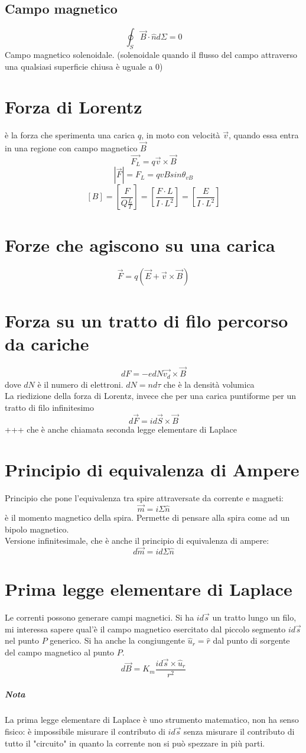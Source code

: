 \documentclass[a4paper]{report}
\begin{document}
  \subsection{Campo magnetico}
  \[ \oint_S \vec{B}\cdot \hat{n} d\Sigma = 0 \]
  Campo magnetico solenoidale. (solenoidale quando il flusso del campo attraverso una qualsiasi superficie chiusa è uguale a 0)

  \section{Forza di Lorentz}
  è la forza che sperimenta una carica $q$, in moto con velocità $\vec{v}$, quando essa entra in una regione con campo magnetico $\vec{B}$
  \[ \vec{F_L} = q\vec{v} \times \vec{B} \]
  \[ |\vec{F}| = F_L = qvB sin\theta_{vB} \]
  \[ [B] = [\frac{F}{Q\frac{L}{T}}] = [\frac{F\cdot L}{I\cdot L^2}] = [\frac{E}{I\cdot L^2}] \]

  \section{Forze che agiscono su una carica}
  \[ \vec{F} = q(\vec{E} + \vec{v} \times \vec{B}) \]

  \section{Forza su un tratto di filo percorso da cariche}
  \[ dF = -e dN \vec{v_d} \times \vec{B}\]
  dove $dN$ è il numero di elettroni. $dN = nd\tau$ che è la densità volumica\\
  La riedizione della forza di Lorentz, invece che per una carica puntiforme per un tratto di filo infinitesimo
  \[ d\vec{F} = i d\vec{S} \times \vec{B} \]+++
  che è anche chiamata seconda legge elementare di Laplace

  \section{Principio di equivalenza di Ampere}
  Principio che pone l'equivalenza tra spire attraversate da corrente e magneti:
  \[ \vec{m} = i \Sigma \hat{n} \]
  è il momento magnetico della spira. Permette di pensare alla spira come ad un bipolo magnetico.\\
  Versione infinitesimale, che è anche il principio di equivalenza di ampere:
  \[ d\vec{m} = id\Sigma \hat{n} \]

  \section{Prima legge elementare di Laplace}
  Le correnti possono generare campi magnetici.
  Si ha $id\vec{s}$ un tratto lungo un filo, mi interessa sapere qual'è il campo magnetico esercitato dal piccolo segmento $id\vec{s}$ nel punto $P$ generico. Si ha anche la congiungente $\hat{u}_r=\hat{r}$ dal punto di sorgente del campo magnetico al punto $P$.
  \[ d\vec{B} = K_m \frac{id\vec{s} \times \hat{u}_r}{r^2} \]
  \subparagraph{Nota}
  La prima legge elementare di Laplace è uno strumento matematico, non ha senso fisico: è impossibile misurare il contributo di $id\vec{s}$ senza misurare il contributo di tutto il "circuito" in quanto la corrente non si può spezzare in più parti.
\end{document}
